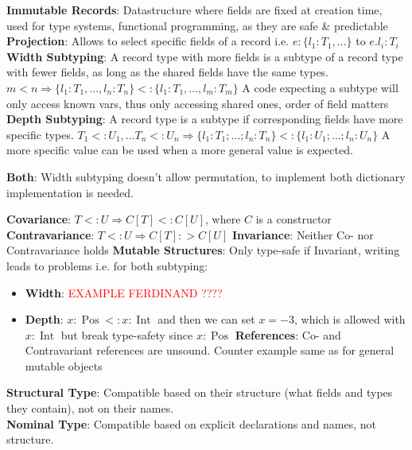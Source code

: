 \textbf{Immutable Records}: Datastructure where  fields are fixed at creation time, used for type systems, functional programming, as they are safe \& predictable\\
\textbf{Projection}: Allows to select specific fields of a record i.e. $e:\{l_1 :T_1 , ...\}$ to $e.l_i : T_i$ \\
\textbf{Width Subtyping}: A record type with more fields is a subtype of a record type with fewer fields, as long as the shared fields have the same types. $m< n \Rightarrow \{l_1 : T_1, \ldots, l_n:T_n \}<: \{l_1 : T_1, \ldots, l_m:T_m\}$ A code expecting a subtype will only access known vars, thus only accessing shared ones, order of field matters\\
\textbf{Depth Subtyping}: A record type is a subtype if corresponding fields have more specific types. $T_1 <: U_1 , \ldots T_n <: U_n \Rightarrow \{l_1 : T_1 ; \ldots ; l_n : T_n\} <: \{l_1 : U_1 ; \ldots ; l_n : U_n\}$ A more specific value can be used when a more general value is expected.

\textbf{Both}: Width subtyping doesn't allow permutation, to implement both dictionary implementation is needed.

\textbf{Covariance}: $T<: U \Rightarrow C[T]<: C[U]$, where $C$ is a constructor
\textbf{Contravariance}: $T<: U \Rightarrow C[T] :> C[U]$
\textbf{Invariance}: Neither Co- nor Contravariance holds
\textbf{Mutable Structures}: Only type-safe if Invariant, writing leads to problems i.e. for both subtyping:
\begin{itemize}[leftmargin = *,noitemsep]
\item \textbf{Width}: \textcolor{Red}{EXAMPLE FERDINAND ????    }
\item \textbf{Depth}: $x:\operatorname{Pos}<: x: \operatorname{Int}$ and then we can set $x=-3$, which is allowed with $x: \operatorname{Int}$ but break type-safety since $x:\operatorname{Pos}$ 
\textbf{References}: Co- and Contravariant references are unsound. Counter example same as for general mutable objects

\end{itemize}


\textbf{Structural Type}: Compatible based on their structure (what fields and types they contain), not on their names.\\
\textbf{Nominal Type}: Compatible based on explicit declarations and names, not structure.

